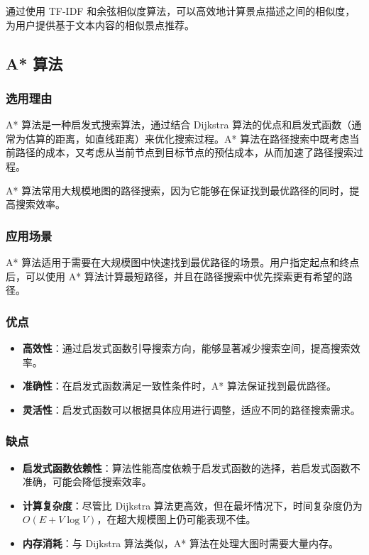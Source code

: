 \documentclass{ctexart}
\begin{document}
通过使用 TF-IDF 和余弦相似度算法，可以高效地计算景点描述之间的相似度，为用户提供基于文本内容的相似景点推荐。

\subsection{A* 算法}

\subsubsection{选用理由}

A* 算法是一种启发式搜索算法，通过结合 Dijkstra 算法的优点和启发式函数（通常为估算的距离，如直线距离）来优化搜索过程。A* 算法在路径搜索中既考虑当前路径的成本，又考虑从当前节点到目标节点的预估成本，从而加速了路径搜索过程。

A* 算法常用大规模地图的路径搜索，因为它能够在保证找到最优路径的同时，提高搜索效率。

\subsubsection{应用场景}

A* 算法适用于需要在大规模图中快速找到最优路径的场景。用户指定起点和终点后，可以使用 A* 算法计算最短路径，并且在路径搜索中优先探索更有希望的路径。

\subsubsection{优点}

\begin{itemize}
    \item \textbf{高效性}：通过启发式函数引导搜索方向，能够显著减少搜索空间，提高搜索效率。
    \item \textbf{准确性}：在启发式函数满足一致性条件时，A* 算法保证找到最优路径。
    \item \textbf{灵活性}：启发式函数可以根据具体应用进行调整，适应不同的路径搜索需求。
\end{itemize}

\subsubsection{缺点}

\begin{itemize}
    \item \textbf{启发式函数依赖性}：算法性能高度依赖于启发式函数的选择，若启发式函数不准确，可能会降低搜索效率。
    \item \textbf{计算复杂度}：尽管比 Dijkstra 算法更高效，但在最坏情况下，时间复杂度仍为 $O(E + V\log V)$，在超大规模图上仍可能表现不佳。
    \item \textbf{内存消耗}：与 Dijkstra 算法类似，A* 算法在处理大图时需要大量内存。
\end{itemize}
\end{document}
